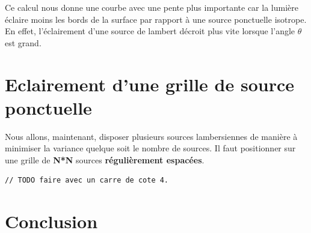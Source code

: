 \documentclass[a4paper,11pt]{article}
\begin{document}
  \newpage
  
  Ce calcul nous donne une courbe avec une pente plus importante car la lumière éclaire moins
  les bords de la surface par rapport à une source ponctuelle isotrope. En effet, l'éclairement 
  d'une source de lambert décroit plus vite lorsque l'angle $\theta$ est grand.
  
  \section{Eclairement d'une grille de source ponctuelle}
  
  Nous allons, maintenant, disposer plusieurs sources lambersiennes de manière à minimiser la 
  variance quelque soit le nombre de sources. Il faut positionner sur une grille de \textbf{N*N}
  sources \textbf{régulièrement espacées}.
  
  \begin{lstlisting}[caption=Code pour l'eclairement d'une grille de sources ponctuelles]
    // TODO faire avec un carre de cote 4.
  \end{lstlisting}
  
  \section*{Conclusion}
    
\end{document}
